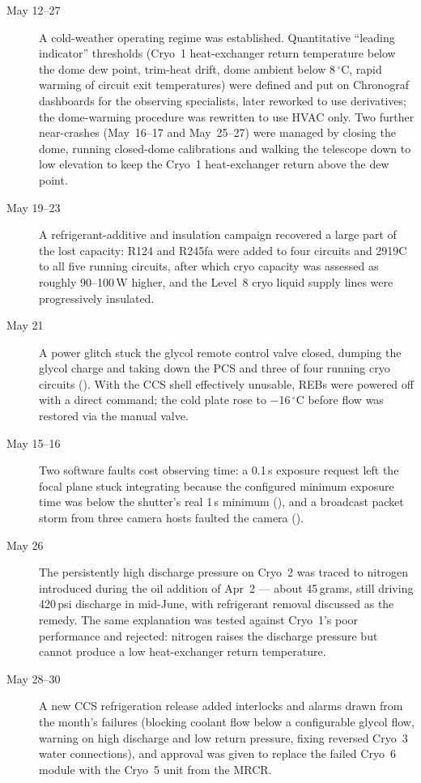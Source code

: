\begin{description}
\item[May 12--27] A cold-weather operating regime was established.
  Quantitative ``leading indicator'' thresholds (Cryo~1 heat-exchanger return
  temperature below the dome dew point, trim-heat drift, dome ambient
  below 8\,$^{\circ}$C, rapid warming of circuit exit temperatures)
  were defined and put on Chronograf dashboards for the observing
  specialists, later reworked to use derivatives; the dome-warming
  procedure was rewritten to use HVAC only.  Two further near-crashes
  (May~16--17 and May~25--27) were managed by closing the dome,
  running closed-dome calibrations and walking the telescope down to
  low elevation to keep the Cryo~1 heat-exchanger return above the dew point.

\item[May 19--23] A refrigerant-additive and insulation campaign
  recovered a large part of the lost capacity: R124 and R245fa were
  added to four circuits and 2919C to all five running circuits, after
  which cryo capacity was assessed as roughly 90--100\,W higher, and
  the Level~8 cryo liquid supply lines were progressively insulated.

\item[May 21] A power glitch stuck the glycol remote control valve
  closed, dumping the glycol charge and taking down the PCS and three
  of four running cryo circuits ().  With the CCS shell
  effectively unusable, REBs were powered off with a direct command;
  the cold plate rose to $-$16\,$^{\circ}$C before flow was restored via
  the manual valve.

\item[May 15--16] Two software faults cost observing time: a 0.1\,s
  exposure request left the focal plane stuck integrating because the
  configured minimum exposure time was below the shutter's real 1\,s
  minimum (), and a broadcast packet storm from three camera
  hosts faulted the camera ().

\item[May 26] The persistently high discharge pressure on Cryo~2 was
  traced to nitrogen introduced during the oil addition of Apr~2 ---
  about 45\,grams, still driving 420\,psi discharge in mid-June, with
  refrigerant removal discussed as the remedy.  The same explanation
  was tested against Cryo~1's poor performance and rejected: nitrogen
  raises the discharge pressure but cannot produce a low
  heat-exchanger return temperature.

\item[May 28--30] A new CCS refrigeration release added interlocks and
  alarms drawn from the month's failures (blocking coolant flow below
  a configurable glycol flow, warning on high discharge and low return
  pressure, fixing reversed Cryo~3 water connections), and approval was
  given to replace the failed Cryo~6 module with the Cryo~5 unit from
  the MRCR.
\end{description}

